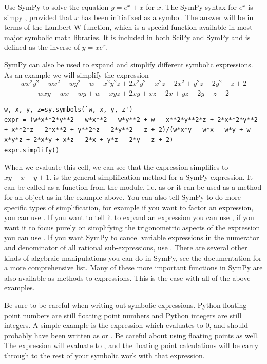 \begin{problem}
Use SymPy to solve the equation $y=e^x+x$ for $x$.
The SymPy syntax for $e^x$ is simpy , provided that $x$ has been initialized as a symbol.
The answer will be in terms of the Lambert W function, which is a special function available in most major symbolic math libraries.
It is included in both SciPy and SymPy and is defined as the inverse of $y=x e^x$.
\end{problem}

SymPy can also be used to expand and simplify different symbolic expressions.
As an example we will simplify the expression
\begin{equation*}
\frac{w x^2 y^2 - w x^2 - w y^2 + w - x^2 y^2 z + 2 x^2 y^2 + x^2 z - 2 x^2 + y^2 z - 2 y^2 - z + 2}{w x y - w x - w y + w - x y z + 2 x y + x z - 2 x + y z - 2 y - z + 2}
\end{equation*}
\begin{lstlisting}
w, x, y, z=sy.symbols(`w, x, y, z')
expr = (w*x**2*y**2 - w*x**2 - w*y**2 + w - x**2*y**2*z + 2*x**2*y**2 + x**2*z - 2*x**2 + y**2*z - 2*y**2 - z + 2)/(w*x*y - w*x - w*y + w - x*y*z + 2*x*y + x*z - 2*x + y*z - 2*y - z + 2)
expr.simplify()
\end{lstlisting}
When we evaluate this cell, we can see that the expression simplifies to $x y + x + y +1$.
 is the general simplification method for a SymPy expression.
It can be called as a function from the module, i.e. as  or it can be used as a method for an object as in the example above.
You can also tell SymPy to do more specific types of simplification, for example if you want to factor an expression, you can use .
If you want to tell it to expand an expression you can use , if you want it to focus purely on simplifying the trigonometric aspects of the expression you can use .
If you want SymPy to cancel variable expressions in the numerator and denominator of all rational sub-expressions, use .
There are several other kinds of algebraic manipulations you can do in SymPy, see the documentation for a more comprehensive list.
Many of these more important functions in SymPy are also available as methods to expressions.
This is the case with all of the above examples.

Be sure to be careful when writing out symbolic expressions.
Python floating point numbers are still floating point numbers and Python integers are still integers.
A simple example is the expression  which evaluates to 0, and should probably have been written as  or .
Be careful about using floating points as well.
The expression  will evaluate to , and the floating point calculations will be carry through to the rest of your symbolic work with that expression.

